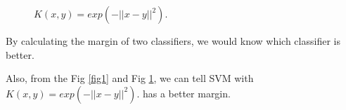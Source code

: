 \documentclass[letter, 12pt]{article}
\begin{document}
\begin{enumerate}
\begin{figure}[H]
\begin{minipage}[b]{.49\textwidth}
		    	\caption{$ K(x, y) = exp(-||x - y||^2 ). $}
		    	\label{fig2}
		    \end{minipage}
    		\centering
    	\end{figure}
    	\par{By calculating the margin of two classifiers, we would know which classifier is better.}
    	\par{Also, from the Fig \ref{fig1} and Fig \ref{fig2}, we can tell SVM with $ K(x, y) = exp(-||x - y||^2 ). $ has a better margin.}
    \end{enumerate}
\end{document}
